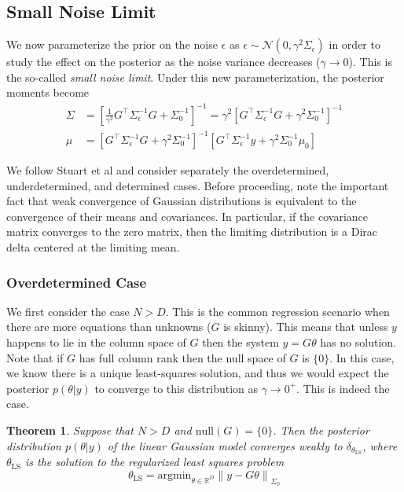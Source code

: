 \documentclass[12pt]{article}
\newcommand*{\norm}[1]{\left\lVert#1\right\rVert}
\newcommand{\R}{\mathbb{R}}
\newtheorem{thm}{Theorem}
\begin{document}
\subsection{Small Noise Limit}
We now parameterize the prior on the noise $\epsilon$ as $\epsilon \sim \mathcal{N}(0, \gamma^2 \Sigma_\epsilon)$ in order to study the effect on the posterior as the noise variance 
decreases ($\gamma \to 0$). This is the so-called \textit{small noise limit}. Under this new parameterization, the posterior moments become 
\begin{align*}
\Sigma &=  \left[\frac{1}{\gamma^2} G^{\top} \Sigma_{\epsilon}^{-1} G + \Sigma_0^{-1} \right]^{-1}  = \gamma^2 \left[G^{\top} \Sigma_{\epsilon}^{-1} G + \gamma^2 \Sigma_0^{-1} \right]^{-1} \\
\mu &= \left[G^{\top} \Sigma_{\epsilon}^{-1} G + \gamma^2 \Sigma_0^{-1} \right]^{-1}  \left[G^{\top} \Sigma_{\epsilon}^{-1}y + \gamma^2 \Sigma_0^{-1} \mu_0 \right]
\end{align*}

We follow Stuart et al and consider separately the overdetermined, underdetermined, and determined cases. Before proceeding, note the important fact that 
weak convergence of Gaussian distributions is equivalent to the convergence of their means and covariances. In particular, if the covariance matrix converges 
to the zero matrix, then the limiting distribution is a Dirac delta centered at the limiting mean. 

\subsubsection{Overdetermined Case}
We first consider the case $N > D$. This is the common regression scenario when there are more equations than unknowns ($G$ is skinny). This means that unless $y$ happens 
to lie in the column space of $G$ then the system $y = G\theta$ has no solution. Note that if $G$ has full column rank then the null space of $G$ is $\{0\}$. In this case,
we know there is a unique least-squares solution, and thus we would expect the posterior $p(\theta|y)$ to converge to this distribution as $\gamma \to 0^+$. This is indeed the case. 

\begin{thm}
Suppose that $N > D$ and $\text{null}(G) = \{0\}$. Then the posterior distribution $p(\theta|y)$ of the linear Gaussian model converges weakly to $\delta_{\theta_{\text{LS}}}$, where 
$\theta_{\text{LS}}$ is the solution to the regularized least squares problem
\[\theta_{\text{LS}} = \text{argmin}_{\theta \in \R^D} \norm{y - G\theta}_{\Sigma_0} \]
\end{thm}
\end{document}

